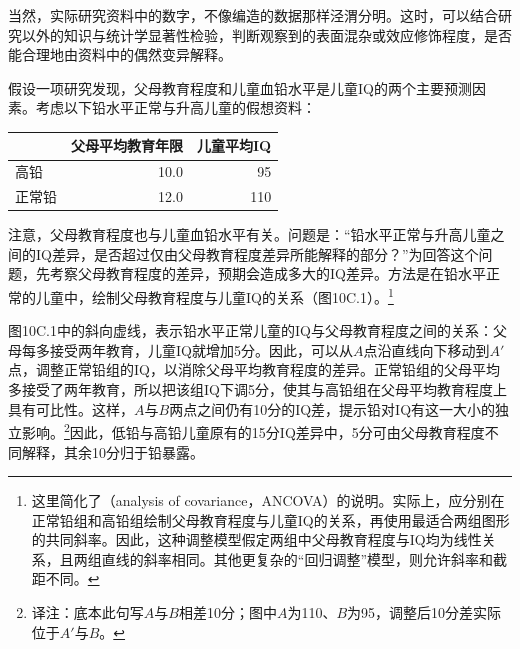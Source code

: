 当然，实际研究资料中的数字，不像编造的数据那样泾渭分明。这时，可以结合研究以外的知识与统计学显著性检验，判断观察到的表面混杂或效应修饰程度，是否能合理地由资料中的偶然变异解释。

假设一项研究发现，父母教育程度和儿童血铅水平是儿童IQ的两个主要预测因素。考虑以下铅水平正常与升高儿童的假想资料：
\begin{center}\begin{tabular}{lrr}\toprule&父母平均教育年限&儿童平均IQ\\\midrule
高铅&10.0&95\\正常铅&12.0&110\\\bottomrule\end{tabular}\end{center}
注意，父母教育程度也与儿童血铅水平有关。问题是：“铅水平正常与升高儿童之间的IQ差异，是否超过仅由父母教育程度差异所能解释的部分？”为回答这个问题，先考察父母教育程度的差异，预期会造成多大的IQ差异。方法是在铅水平正常的儿童中，绘制父母教育程度与儿童IQ的关系（图10C.1）。\footnote{这里简化了（analysis of covariance，ANCOVA）的说明。实际上，应分别在正常铅组和高铅组绘制父母教育程度与儿童IQ的关系，再使用最适合两组图形的共同斜率。因此，这种调整模型假定两组中父母教育程度与IQ均为线性关系，且两组直线的斜率相同。其他更复杂的“回归调整”模型，则允许斜率和截距不同。}
\par
\begin{center}\begin{minipage}{\textwidth}\centering\chTenIQ
{}
\end{minipage}\end{center}
\par
{}
图10C.1中的斜向虚线，表示铅水平正常儿童的IQ与父母教育程度之间的关系：父母每多接受两年教育，儿童IQ就增加5分。因此，可以从$A$点沿直线向下移动到$A'$点，调整正常铅组的IQ，以消除父母平均教育程度的差异。正常铅组的父母平均多接受了两年教育，所以把该组IQ下调5分，使其与高铅组在父母平均教育程度上具有可比性。这样，$A$与$B$两点之间仍有10分的IQ差，提示铅对IQ有这一大小的独立影响。\footnote{译注：底本此句写$A$与$B$相差10分；图中$A$为110、$B$为95，调整后10分差实际位于$A'$与$B$。}因此，低铅与高铅儿童原有的15分IQ差异中，5分可由父母教育程度不同解释，其余10分归于铅暴露。

